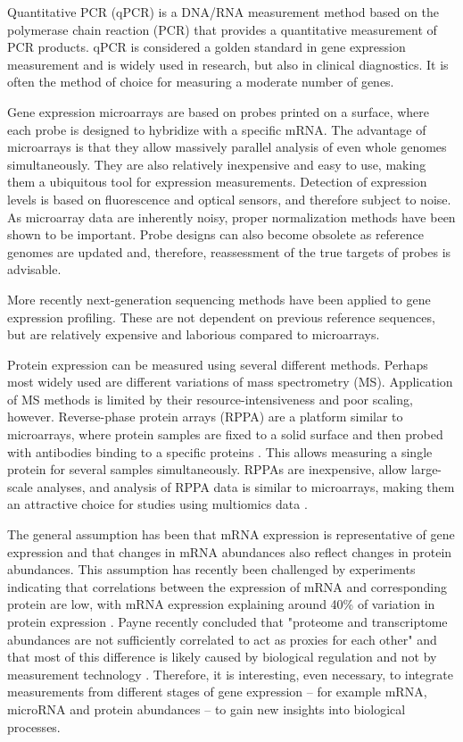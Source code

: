 Quantitative PCR (qPCR) is a DNA/RNA measurement method based on the
polymerase chain reaction (PCR) that provides a quantitative measurement of
PCR products. qPCR is considered a golden standard in gene expression
measurement and is widely used in research, but also in clinical diagnostics.
It is often the method of choice for measuring a moderate number of genes. \citep{VanGuilder2008}

Gene expression microarrays are based on probes printed on a
surface, where each probe is designed to hybridize with a specific mRNA.
The advantage of microarrays is that they allow massively
parallel analysis of even whole genomes simultaneously. They are also relatively inexpensive and
easy to use, making them a ubiquitous tool for expression measurements. Detection
of expression levels is based on fluorescence and optical sensors, and
therefore subject to noise. As microarray data are inherently noisy, proper
normalization methods have been shown to be important. Probe designs can also
become obsolete as reference genomes are updated and, therefore, reassessment
of the true targets of probes is advisable. \citep{Allison2006}

More recently next-generation sequencing methods have been applied to gene
expression profiling. These are not dependent on previous reference sequences,
but are relatively expensive and laborious compared to microarrays.

Protein expression can be measured using several different methods. Perhaps most widely
used are different variations of mass spectrometry (MS). Application of MS methods is
limited by their resource-intensiveness and poor scaling, however. Reverse-phase protein
arrays (RPPA) are a platform similar to microarrays, where protein samples are fixed
to a solid surface and then probed with antibodies binding to a specific proteins \citep{Charboneau2002}.
This allows measuring a single protein for several samples simultaneously.
RPPAs are inexpensive, allow large-scale analyses, and analysis of RPPA data is
similar to microarrays, making them an attractive choice for studies
using multiomics data \citep{Mannsperger2010}.

The general assumption has been that mRNA expression is representative of gene
expression and that changes in mRNA abundances also reflect changes in protein
abundances. This assumption has recently been challenged by experiments
indicating that correlations between the expression of mRNA and corresponding
protein are low, with mRNA expression explaining around 40\% of variation in
protein expression \citep{Vogel2012}.
Payne recently concluded that "proteome and transcriptome
abundances are not sufficiently correlated to act as proxies for each other"
and that most of this difference is likely caused by biological regulation and
not by measurement technology \cite{Payne2015}.
Therefore, it is interesting, even necessary, to integrate measurements from
different stages of gene expression -- for example mRNA, microRNA and protein
abundances -- to gain new insights into biological processes.


